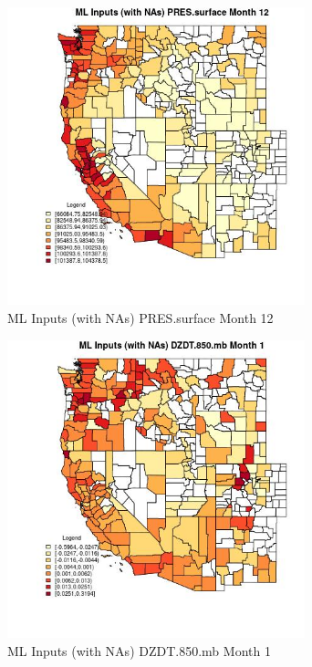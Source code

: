 \begin{figure} 
\centering  
\includegraphics[width=0.77\textwidth]{Code_Outputs/Report_ML_input_PM25_Step4_part_f_de_duplicated_aves_prioritize_24hr_obswNAs_CountyPRESsurfacemedianMonth12.jpg} 
\caption{\label{fig:Report_ML_input_PM25_Step4_part_f_de_duplicated_aves_prioritize_24hr_obswNAsCountyPRESsurfacemedianMonth12}ML Inputs (with NAs) PRES.surface Month 12} 
\end{figure} 
 

\begin{figure} 
\centering  
\includegraphics[width=0.77\textwidth]{Code_Outputs/Report_ML_input_PM25_Step4_part_f_de_duplicated_aves_prioritize_24hr_obswNAs_CountyDZDT850mbmedianMonth1.jpg} 
\caption{\label{fig:Report_ML_input_PM25_Step4_part_f_de_duplicated_aves_prioritize_24hr_obswNAsCountyDZDT850mbmedianMonth1}ML Inputs (with NAs) DZDT.850.mb Month 1} 
\end{figure} 
 

